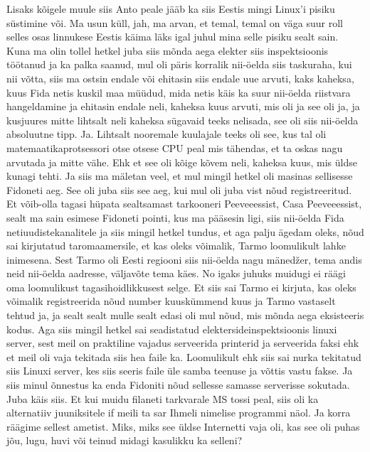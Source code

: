 Lisaks kõigele muule siis Anto peale jääb ka siis Eestis mingi Linux'i pisiku süstimine või.
Ma usun küll, jah, ma arvan, et temal, temal on väga suur roll selles osas linnukese Eestis käima läks igal juhul mina selle pisiku sealt sain. Kuna ma olin tollel hetkel juba siis mõnda aega elekter siis inspektsioonis töötanud ja ka palka saanud, mul oli päris korralik nii-öelda siis taskuraha, kui nii võtta, siis ma ostsin endale või ehitasin siis endale uue arvuti, kaks kaheksa, kuus Fida netis kuskil maa müüdud, mida netis käis ka suur nii-öelda riistvara hangeldamine ja ehitasin endale neli, kaheksa kuus arvuti, mis oli ja see oli ja, ja kusjuures mitte lihtsalt neli kaheksa sügavaid teeks nelisada, see oli siis nii-öelda absoluutne tipp. Ja.
Lihtsalt nooremale kuulajale teeks oli see, kus tal oli matemaatikaprotsessori otse otsese CPU peal mis tähendas, et ta oskas nagu arvutada ja mitte vähe.
Ehk et see oli kõige kõvem neli, kaheksa kuus, mis üldse kunagi tehti. Ja siis ma mäletan veel, et mul mingil hetkel oli masinas sellisesse Fidoneti aeg. See oli juba siis see aeg, kui mul oli juba vist nõud registreeritud. Et võib-olla tagasi hüpata sealtsamast tarkooneri Peeveeessist, Casa Peeveeessist, sealt ma sain esimese Fidoneti pointi, kus ma pääsesin ligi, siis nii-öelda Fida netiuudistekanalitele ja siis mingil hetkel tundus, et aga palju ägedam oleks, nõud sai kirjutatud taromaamersile, et kas oleks võimalik, Tarmo loomulikult lahke inimesena. Sest Tarmo oli Eesti regiooni siis nii-öelda nagu mänedžer, tema andis neid nii-öelda aadresse, väljavõte tema käes.
No igaks juhuks muidugi ei räägi oma loomulikust tagasihoidlikkusest selge.
Et siis sai Tarmo ei kirjuta, kas oleks võimalik registreerida nõud number kuuskümmend kuus ja Tarmo vastaselt tehtud ja, ja sealt sealt mulle sealt edasi oli mul nõud, mis mõnda aega eksisteeris kodus. Aga siis mingil hetkel sai seadistatud elektersideinspektsioonis linuxi server, sest meil on praktiline vajadus serveerida printerid ja serveerida faksi ehk et meil oli vaja tekitada siis hea faile ka. Loomulikult ehk siis sai nurka tekitatud siis Linuxi server, kes siis seeris faile üle samba teenuse ja võttis vastu fakse. Ja siis minul õnnestus ka enda Fidoniti nõud sellesse samasse serverisse sokutada.
Juba käis siis.
Et kui muidu filaneti tarkvarale MS tossi peal, siis oli ka alternatiiv juuniksitele if meili ta sar Ihmeli nimelise programmi näol.
Ja korra räägime sellest ametist. Miks, miks see üldse Internetti vaja oli, kas see oli puhas jõu, lugu, huvi või teinud midagi kasulikku ka selleni?
